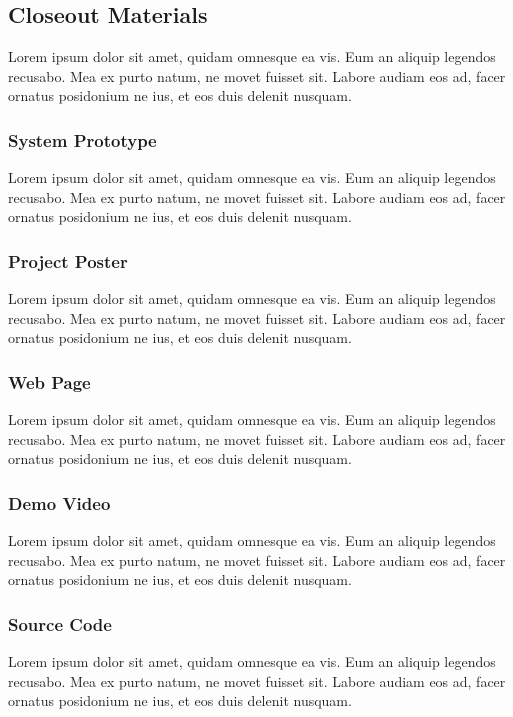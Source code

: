\subsection{Closeout Materials}
Lorem ipsum dolor sit amet, quidam omnesque ea vis. Eum an aliquip legendos recusabo. Mea ex purto natum, ne movet fuisset sit. Labore audiam eos ad, facer ornatus posidonium ne ius, et eos duis delenit nusquam.

\subsubsection{System Prototype}
Lorem ipsum dolor sit amet, quidam omnesque ea vis. Eum an aliquip legendos recusabo. Mea ex purto natum, ne movet fuisset sit. Labore audiam eos ad, facer ornatus posidonium ne ius, et eos duis delenit nusquam.

\subsubsection{Project Poster}
Lorem ipsum dolor sit amet, quidam omnesque ea vis. Eum an aliquip legendos recusabo. Mea ex purto natum, ne movet fuisset sit. Labore audiam eos ad, facer ornatus posidonium ne ius, et eos duis delenit nusquam.

\subsubsection{Web Page}
Lorem ipsum dolor sit amet, quidam omnesque ea vis. Eum an aliquip legendos recusabo. Mea ex purto natum, ne movet fuisset sit. Labore audiam eos ad, facer ornatus posidonium ne ius, et eos duis delenit nusquam.

\subsubsection{Demo Video}
Lorem ipsum dolor sit amet, quidam omnesque ea vis. Eum an aliquip legendos recusabo. Mea ex purto natum, ne movet fuisset sit. Labore audiam eos ad, facer ornatus posidonium ne ius, et eos duis delenit nusquam.

\subsubsection{Source Code}
Lorem ipsum dolor sit amet, quidam omnesque ea vis. Eum an aliquip legendos recusabo. Mea ex purto natum, ne movet fuisset sit. Labore audiam eos ad, facer ornatus posidonium ne ius, et eos duis delenit nusquam.

